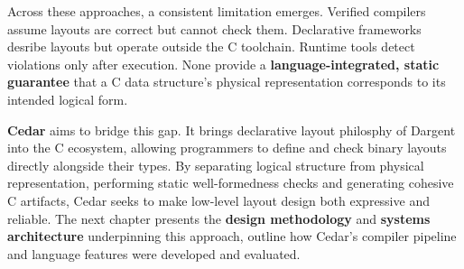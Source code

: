 Across these approaches, a consistent limitation emerges. Verified compilers
assume layouts are correct but cannot check them. Declarative frameworks desribe
layouts but operate outside the C toolchain. Runtime tools detect violations
only after execution. None provide a \textbf{language-integrated, static
guarantee} that a C data structure's physical representation corresponds to its
intended logical form.

\textbf{Cedar} aims to bridge this gap. It brings declarative layout
philosphy of Dargent into the C ecosystem, allowing programmers to define
and check binary layouts directly alongside
their types. By separating logical structure from physical representation,
performing static well-formedness checks and generating cohesive C artifacts,
Cedar seeks to make low-level layout design both
expressive and reliable. The next chapter presents the
\textbf{design methodology} and \textbf{systems architecture} underpinning
this approach, outline how Cedar's compiler pipeline and language
features were developed and evaluated. 